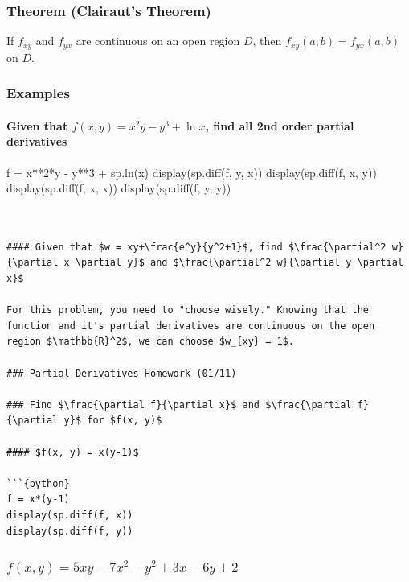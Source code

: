 \documentclass[
  letterpaper,
  DIV=11,
  numbers=noendperiod]{scrartcl}
\let\oldparagraph\paragraph
\renewcommand{\paragraph}[1]{\oldparagraph{#1}\mbox{}}
\begin{document}
\subsubsection{Theorem (Clairaut's
Theorem)}\label{theorem-clairauts-theorem}

If \(f_{xy}\) and \(f_{yx}\) are continuous on an open region \(D\),
then \(f_{xy}(a, b) = f_{yx}(a, b)\) on \(D\).

\subsubsection{Examples}\label{examples-6}

\paragraph{\texorpdfstring{Given that \(f(x, y) = x^2y-y^3+\ln x\), find
\textbf{all} 2nd order partial
derivatives}{Given that f(x, y) = x\^{}2y-y\^{}3+\textbackslash ln x, find all 2nd order partial derivatives}}\label{given-that-fx-y-x2y-y3ln-x-find-all-2nd-order-partial-derivatives}

f = x**2*y - y**3 + sp.ln(x) display(sp.diff(f, y, x))
display(sp.diff(f, x, y)) display(sp.diff(f, x, x)) display(sp.diff(f,
y, y))

\begin{verbatim}


#### Given that $w = xy+\frac{e^y}{y^2+1}$, find $\frac{\partial^2 w}{\partial x \partial y}$ and $\frac{\partial^2 w}{\partial y \partial x}$

For this problem, you need to "choose wisely." Knowing that the function and it's partial derivatives are continuous on the open region $\mathbb{R}^2$, we can choose $w_{xy} = 1$.

### Partial Derivatives Homework (01/11)

### Find $\frac{\partial f}{\partial x}$ and $\frac{\partial f}{\partial y}$ for $f(x, y)$

#### $f(x, y) = x(y-1)$

```{python}
f = x*(y-1)
display(sp.diff(f, x))
display(sp.diff(f, y))
\end{verbatim}

\subsubsection{\texorpdfstring{\(f(x, y) = 5xy - 7x^2 - y^2 + 3x - 6y +2\)}{f(x, y) = 5xy - 7x\^{}2 - y\^{}2 + 3x - 6y +2}}\label{fx-y-5xy---7x2---y2-3x---6y-2}
\end{document}

